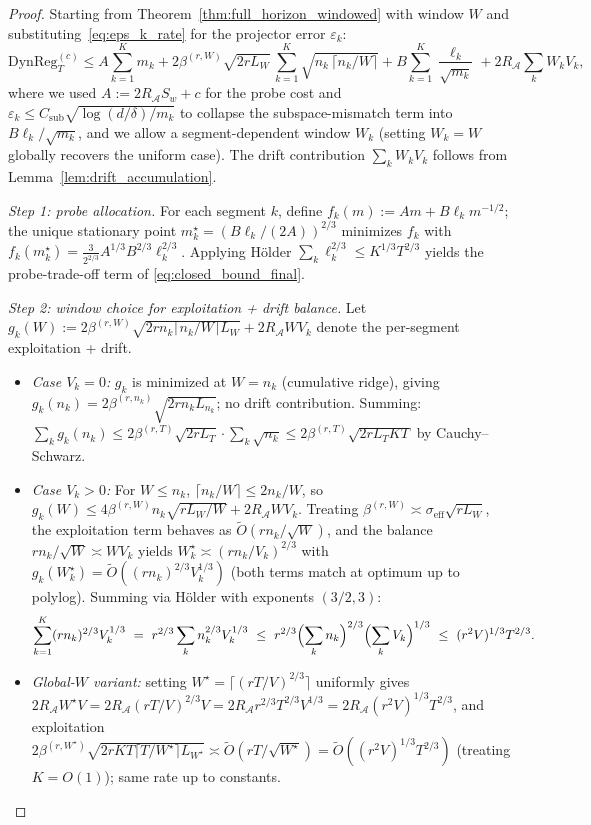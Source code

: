 \documentclass[11pt]{article}
\newcommand{\cA}{\mathcal{A}}
\newcommand{\DynReg}{\mathrm{DynReg}}
\begin{document}
\begin{proof}
Starting from Theorem~\ref{thm:full_horizon_windowed} with window $W$ and
substituting~\eqref{eq:eps_k_rate} for the projector error $\varepsilon_k$:
\begin{equation}
\DynReg_T^{(c)}\le
A\sum_{k=1}^K m_k
+ 2\beta^{(r,W)}\sqrt{2rL_W}\,\sum_{k=1}^K\sqrt{n_k\,\lceil n_k/W\rceil}
+ B\sum_{k=1}^K\frac{\ell_k}{\sqrt{m_k}}
+ 2R_{\cA}\sum_k W_k V_k,
\label{eq:full_decomp}
\end{equation}
where we used $A:=2R_{\cA}S_w+c$ for the probe cost and
$\varepsilon_k\le C_{\mathrm{sub}}\sqrt{\log(d/\delta)/m_k}$ to collapse the
subspace-mismatch term into $B\ell_k/\sqrt{m_k}$, and we allow a
segment-dependent window $W_k$ (setting $W_k=W$ globally recovers the uniform case).
The drift contribution $\sum_k W_k V_k$ follows from Lemma~\ref{lem:drift_accumulation}.

\medskip
\emph{Step 1: probe allocation.}
For each segment $k$, define $f_k(m):=Am+B\ell_k m^{-1/2}$; the unique stationary
point $m_k^\star=(B\ell_k/(2A))^{2/3}$ minimizes $f_k$ with
$f_k(m_k^\star)=\tfrac{3}{2^{2/3}}A^{1/3}B^{2/3}\ell_k^{2/3}$.  Applying H\"older
$\sum_k\ell_k^{2/3}\le K^{1/3}T^{2/3}$ yields the probe-trade-off term of
\eqref{eq:closed_bound_final}.

\medskip
\emph{Step 2: window choice for exploitation + drift balance.}
Let $g_k(W):=2\beta^{(r,W)}\sqrt{2rn_k\lceil n_k/W\rceil L_W}+2R_{\cA}W V_k$
denote the per-segment exploitation + drift.
\begin{itemize}[leftmargin=1.2em,nosep]
\item \emph{Case $V_k=0$:} $g_k$ is minimized at $W=n_k$ (cumulative ridge), giving
$g_k(n_k)=2\beta^{(r,n_k)}\sqrt{2rn_kL_{n_k}}$; no drift contribution.
Summing: $\sum_k g_k(n_k)\le 2\beta^{(r,T)}\sqrt{2rL_T}\cdot\sum_k\sqrt{n_k}\le
2\beta^{(r,T)}\sqrt{2rL_T KT}$ by Cauchy--Schwarz.
\item \emph{Case $V_k>0$:} For $W\le n_k$, $\lceil n_k/W\rceil\le 2n_k/W$, so
$g_k(W)\le 4\beta^{(r,W)}n_k\sqrt{rL_W/W}+2R_\cA W V_k$.  Treating
$\beta^{(r,W)}\asymp\sigma_{\mathrm{eff}}\sqrt{rL_W}$, the exploitation term
behaves as $\widetilde O(rn_k/\sqrt W)$, and the balance
$rn_k/\sqrt W\asymp WV_k$ yields $W_k^\star\asymp(rn_k/V_k)^{2/3}$ with
$g_k(W_k^\star)=\widetilde O((rn_k)^{2/3}V_k^{1/3})$ (both terms match at optimum
up to polylog).  Summing via H\"older with exponents $(3/2,3)$:
\[
  \sum_{k=1}^K(rn_k)^{2/3}V_k^{1/3}
  \ =\ r^{2/3}\sum_k n_k^{2/3}V_k^{1/3}
  \ \le\ r^{2/3}\Bigl(\sum_k n_k\Bigr)^{2/3}\Bigl(\sum_k V_k\Bigr)^{1/3}
  \ \le\ (r^2 V)^{1/3}T^{2/3}.
\]
\item \emph{Global-$W$ variant:} setting $W^\star=\lceil(rT/V)^{2/3}\rceil$ uniformly gives
$2R_\cA W^\star V=2R_\cA (rT/V)^{2/3}V=2R_\cA r^{2/3}T^{2/3}V^{1/3}=2R_\cA(r^2V)^{1/3}T^{2/3}$,
and exploitation
$2\beta^{(r,W^\star)}\sqrt{2rKT\lceil T/W^\star\rceil L_{W^\star}}\asymp
\widetilde O(rT/\sqrt{W^\star})=\widetilde O((r^2V)^{1/3}T^{2/3})$
(treating $K=O(1)$); same rate up to constants.
\end{itemize}


\end{proof}
\end{document}
